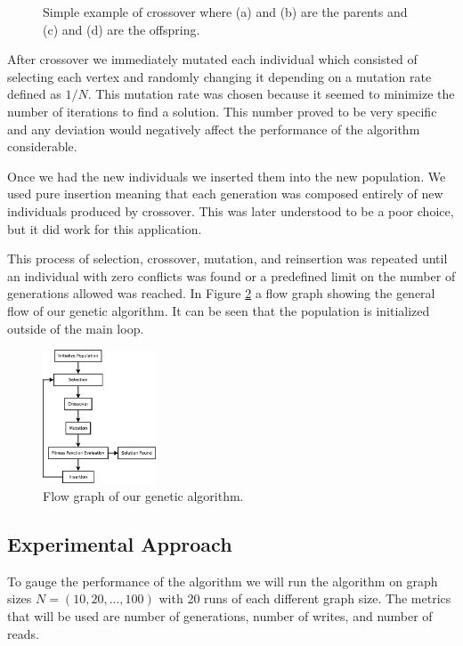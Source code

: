 \documentclass{article}
\begin{document}
\begin{figure}[h!]
\begin{subfigure}{0.18\textwidth}
		\end{subfigure}
		
		\caption{Simple example of crossover where (a) and (b) are the parents and (c) and (d) are the offspring.}
		\label{cross_example}
	\end{figure}
	
	After crossover we immediately mutated each individual which consisted of selecting each vertex and randomly changing it depending on a mutation rate defined as $1/N$. This mutation rate was chosen because it seemed to minimize the number of iterations to find a solution. This number proved to be very specific and any deviation would negatively affect the performance of the algorithm considerable. 
	
	Once we had the new individuals we inserted them into the new population. We used pure insertion meaning that each generation was composed entirely of new individuals produced by crossover. This was later understood to be a poor choice, but it did work for this application. 
	
	This process of selection, crossover, mutation, and reinsertion was repeated until an individual with zero conflicts was found or a predefined limit on the number of generations allowed was reached. In Figure \ref{genetic_flow} a flow graph showing the general flow of our genetic algorithm. It can be seen that the population is initialized outside of the main loop. 
	
	\begin{figure}[h!]
		\centering
		\includegraphics[width=0.3\textwidth]{images/genetic_flo}
		\caption{Flow graph of our genetic algorithm.}
		\label{genetic_flow}
	\end{figure}
	
	\subsection{Experimental Approach}
	To gauge the performance of the algorithm we will run the algorithm on graph sizes $N = (10, 20, ..., 100)$ with 20 runs of each different graph size. The metrics that will be used are number of generations, number of writes, and number of reads.
	
\end{document}
